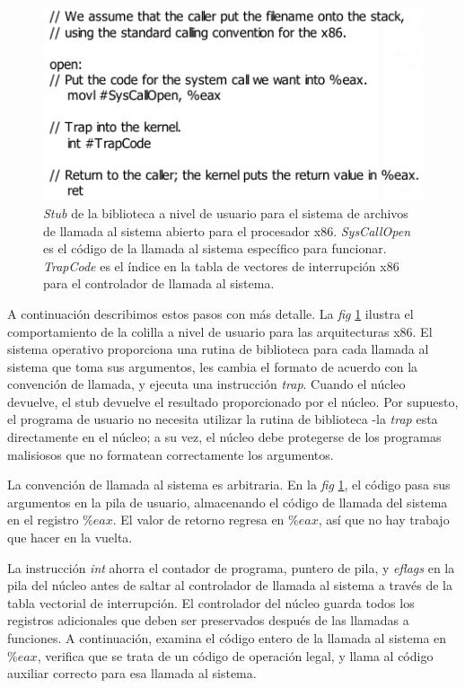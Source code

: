 \documentclass[10pt]{book}
\begin{document}
\begin{figure}[tbhp]
\centerline{\includegraphics[scale=0.45]{img/fig0210}}
\caption{\textit{Stub} de la biblioteca a nivel de usuario para el sistema de archivos de llamada al sistema abierto para el procesador x$86$. \textit{SysCallOpen} es el código de la llamada al sistema específico para funcionar. \textit{TrapCode} es el índice en la tabla de vectores de interrupción x$86$ para el controlador de llamada al sistema.}
\label{fig0210}
\end{figure}

A continuación describimos estos pasos con más detalle. La \textit{fig} \ref{fig0210} ilustra el comportamiento de la colilla a nivel de usuario para las arquitecturas x$86$. El sistema operativo proporciona una rutina de biblioteca para cada llamada al sistema que toma sus argumentos, les cambia el formato de acuerdo con la convención de llamada, y ejecuta una instrucción \textit{trap}. Cuando el núcleo devuelve, el stub devuelve el resultado proporcionado por el núcleo. Por supuesto, el programa de usuario no necesita utilizar la rutina de biblioteca -la \textit{trap} esta directamente en el núcleo; a su vez, el núcleo debe protegerse de los programas malisiosos que no formatean correctamente los argumentos.

La convención de llamada al sistema es arbitraria. En la \textit{fig} \ref{fig0210}, el código pasa sus argumentos en la pila de usuario, almacenando el código de llamada del sistema en el registro $\% eax$. El valor de retorno regresa en $\% eax$, así que no hay trabajo que hacer en la vuelta.

La instrucción \textit{int} ahorra el contador de programa, puntero de pila, y \textit{eflags} en la pila del núcleo antes de saltar al controlador de llamada al sistema a través de la tabla vectorial de interrupción. El controlador del núcleo guarda todos los registros adicionales que deben ser preservados después de las llamadas a funciones. A continuación, examina el código entero de la  llamada al sistema en $\% eax$, verifica que se trata de un código de operación legal, y llama al código auxiliar correcto para esa llamada al sistema.
\end{document}
